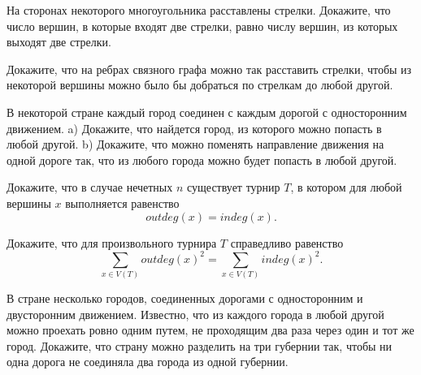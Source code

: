 \begin{exersize}
	На сторонах некоторого многоугольника расставлены стрелки. Докажите, что число вершин, в которые входят 
	две стрелки, равно числу вершин, из которых выходят две стрелки.
\end{exersize}

\begin{exersize}
	Докажите, что на ребрах связного графа можно так расставить стрелки, чтобы из некоторой вершины можно 
	было бы добраться по стрелкам до любой другой.
\end{exersize}

\begin{exersize}
	 В некоторой стране каждый город соединен с каждым дорогой с односторонним движением. 
	 a) Докажите, что найдется город, из которого можно попасть в любой другой. 
	 b) Докажите, что можно поменять направление движения на одной дороге так, что из любого города можно будет попасть в любой другой.
\end{exersize}

\begin{exersize}
	Докажите, что в случае нечетных $n$ существует турнир $T$, в котором для любой вершины $x$ выполняется равенство
	$$outdeg(x) = indeg(x).$$
\end{exersize}

\begin{exersize}
	Докажите, что для произвольного турнира $T$ справедливо равенство
	$$\sum_{x \in V(T)} outdeg(x)^2 = \sum_{x \in V(T)} indeg(x)^2.$$
\end{exersize}


\begin{exersize}
	В стране несколько городов, соединенных дорогами с односторонним и двусторонним движением. 
	Известно, что из каждого города в любой другой можно проехать ровно одним путем, не проходящим 
	два раза через один и тот же город. Докажите, что страну можно разделить на три губернии так, 
	чтобы ни одна дорога не соединяла два города из одной губернии.
\end{exersize}	

